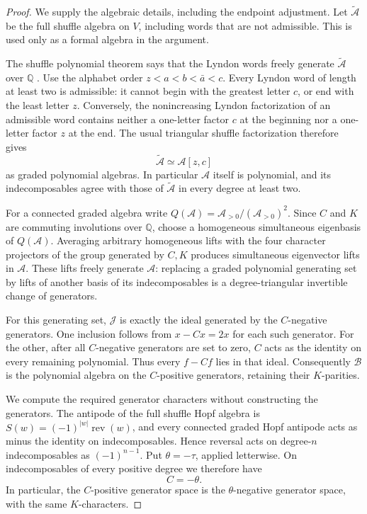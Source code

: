 \begin{proof}
We supply the algebraic details, including the endpoint adjustment.
Let $\widetilde{\mathcal A}$ be the full shuffle algebra on $V$,
including words that are not admissible.  This is used only as a formal
algebra in the argument.

The shuffle polynomial theorem says that the Lyndon words freely
generate $\widetilde{\mathcal A}$ over $\mathbb Q$
\cite{cayley:radford,cayley:melancon-reutenauer}.
Use the alphabet order $z<a<b<\bar a<c$.  Every Lyndon word of length
at least two is admissible: it cannot begin with the greatest letter
$c$, or end with the least letter $z$.  Conversely, the nonincreasing
Lyndon factorization of an admissible word contains neither a
one-letter factor $c$ at the beginning nor a one-letter factor $z$
at the end.  The usual triangular shuffle factorization therefore
gives
\begin{equation}\label{cayley:eq:polynomial-endpoints}
 \widetilde{\mathcal A}\simeq\mathcal A[z,c]
\end{equation}
as graded polynomial algebras.  In particular $\mathcal A$ itself is
polynomial, and its indecomposables agree with those of
$\widetilde{\mathcal A}$ in every degree at least two.

For a connected graded algebra write
$Q(\mathcal A)=\mathcal A_{>0}/(\mathcal A_{>0})^2$.
Since $C$ and $K$ are commuting involutions over $\mathbb Q$, choose
a homogeneous simultaneous eigenbasis of $Q(\mathcal A)$.
Averaging arbitrary homogeneous lifts with the four character
projectors of the group generated by $C,K$ produces simultaneous
eigenvector lifts in $\mathcal A$.  These lifts freely generate
$\mathcal A$: replacing a graded polynomial generating set by lifts
of another basis of its indecomposables is a degree-triangular
invertible change of generators.

For this generating set, $\mathcal J$ is exactly the ideal generated
by the $C$-negative generators.  One inclusion follows from
$x-Cx=2x$ for each such generator.  For the other, after all
$C$-negative generators are set to zero, $C$ acts as the identity
on every remaining polynomial.  Thus every $f-Cf$ lies in that
ideal.  Consequently $\mathcal B$ is the polynomial algebra on
the $C$-positive generators, retaining their $K$-parities.

We compute the required generator characters without constructing
the generators.  The antipode of the full shuffle Hopf algebra is
$S(w)=(-1)^{|w|}\operatorname{rev}(w)$, and every connected graded
Hopf antipode acts as minus the identity on indecomposables.
Hence reversal acts on degree-$n$ indecomposables as
$(-1)^{n-1}$.  Put $\theta=-\tau$, applied letterwise.  On
indecomposables of every positive degree we therefore have
\[
 C=-\theta.
\]
In particular, the $C$-positive generator space is the
$\theta$-negative generator space, with the same $K$-characters.


\end{proof}
